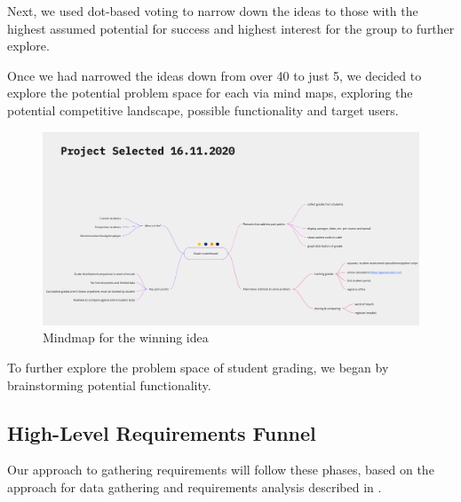 Next, we used dot-based voting to narrow down the ideas to those with the highest assumed potential for success and highest interest for the group to further explore. 

Once we had narrowed the ideas down from over 40 to just 5, we decided to explore the potential problem space for each via mind maps, exploring the potential competitive landscape, possible functionality and target users.

\begin{figure}[H]
    \centering
\includegraphics[width=\textwidth]{images/mindmap.png}
    \caption{Mindmap for the winning idea}
    \label{fig:mindmap}
\end{figure}

To further explore the problem space of student grading, we began by brainstorming potential functionality. 

\subsection{High-Level Requirements Funnel}

Our approach to gathering requirements will follow these phases, based on the approach for data gathering and requirements analysis described in \cite{sharp_2019}.

